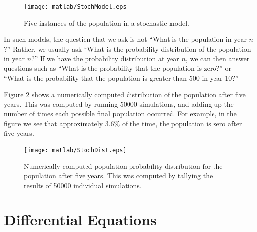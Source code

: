 \documentclass[reqno]{immbook}
\numberwithin{equation}{chapter}
\numberwithin{question}{section}
\numberwithin{theorem}{chapter}
\numberwithin{figure}{chapter}
\theoremstyle{definition}
\begin{document}
\begin{figure}
\centerline{\texttt{[image: matlab/StochModel.eps]}}
\caption{Five instances of the population in 
a stochastic model.}
\label{fig:StochModel}
\end{figure}

In such models, the question that we ask is not
``What is the population in year $n$?''
Rather, we usually ask ``What is the probability
distribution of the population in year $n$?''
If we have the probability distribution at year
$n$, we can then answer questions such as
``What is the probability that the population is zero?''
or ``What is the probability that the population is
greater than 500 in year 10?''

Figure \ref{fig:StochDist} shows a numerically
computed distribution of the population after
five years. This was computed by running 50000
simulations, and adding up the number of times
each possible final population occurred.
For example, in the figure we see that
approximately 3.6\% of the time, the population
is zero after five years.

\begin{figure}
\centerline{\texttt{[image: matlab/StochDist.eps]}}
\caption{Numerically computed population
probability distribution for the population
after five years.  This was computed by
tallying the results of 50000 individual
simulations.}
\label{fig:StochDist}
\end{figure}


\chapter{Differential Equations}


\end{document}
